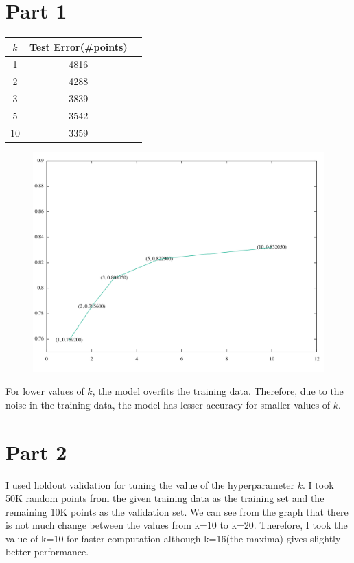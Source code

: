 \documentclass[a4paper,11pt]{article}
\begin{document}
\begin{mlsolution}
\section*{Part 1}
\begin{center}
\begin{tabular}{ |c|c|c| } 
 \hline
 $k$ & Test Error(\#points) \\ \hline
 1 & 4816 \\ 
 2 & 4288 \\
 3 & 3839 \\
 5 & 3542 \\
 10 & 3359 \\ 
 \hline
\end{tabular}
\end{center}

\begin{figure}[th]%
\centering
\includegraphics[scale = 0.5]{q61_plot.png}%
\label{fig:proto}%
\end{figure}

For lower values of $k$, the model overfits the training data. Therefore, due to the noise in the training data, the model has lesser accuracy for smaller values of $k$.

\section*{Part 2}
I used holdout validation for tuning the value of the hyperparameter $k$. I took 50K random points from the given training data as the training set and the remaining 10K points as the validation set. We can see from the graph that there is not much change between the values from k=10 to k=20. Therefore, I took the value of k=10 for faster computation although k=16(the maxima) gives slightly better performance.


\end{mlsolution}
\end{document}
